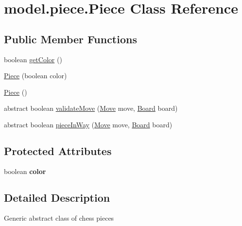 \hypertarget{classmodel_1_1piece_1_1_piece}{\section{model.\-piece.\-Piece Class Reference}
\label{classmodel_1_1piece_1_1_piece}
}
\subsection*{Public Member Functions}
\begin{DoxyCompactItemize}
\item 
boolean \hyperlink{classmodel_1_1piece_1_1_piece_ade136dec6d1257b4f9254789469c7e7a}{get\-Color} ()
\item 
\hyperlink{classmodel_1_1piece_1_1_piece_affc8fb007453dfe48f93ce19ab686fcc}{Piece} (boolean color)
\item 
\hyperlink{classmodel_1_1piece_1_1_piece_a20f6e7ef7d17647a4a472e32b8330e64}{Piece} ()
\item 
abstract boolean \hyperlink{classmodel_1_1piece_1_1_piece_af7ce06755c9f20f3481796ca5b512849}{validate\-Move} (\hyperlink{classmodel_1_1_move}{Move} move, \hyperlink{classmodel_1_1board_1_1_board}{Board} board)
\item 
abstract boolean \hyperlink{classmodel_1_1piece_1_1_piece_a5d0c25ee8eec8a6d8b24644f16c6c58b}{piece\-In\-Way} (\hyperlink{classmodel_1_1_move}{Move} move, \hyperlink{classmodel_1_1board_1_1_board}{Board} board)
\end{DoxyCompactItemize}
\subsection*{Protected Attributes}
\begin{DoxyCompactItemize}
\item 
\hypertarget{classmodel_1_1piece_1_1_piece_a1d47bc71ab231c4c6ec1aaa85ed12427}{boolean {\bfseries color}}\label{classmodel_1_1piece_1_1_piece_a1d47bc71ab231c4c6ec1aaa85ed12427}

\end{DoxyCompactItemize}


\subsection{Detailed Description}
Generic abstract class of chess pieces 

